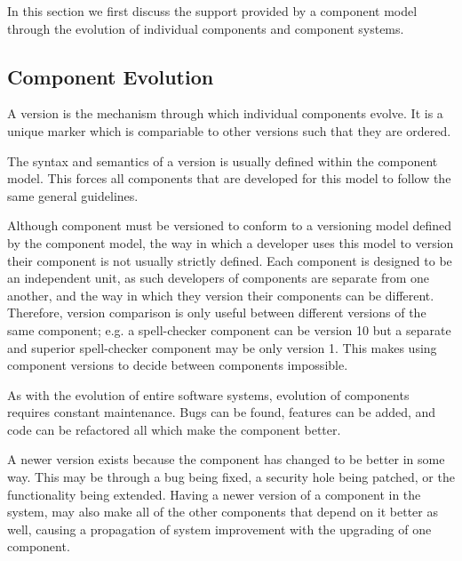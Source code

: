 
{}In this section we first discuss the support provided by a component model through the evolution of individual components and component systems.

\subsection{Component Evolution}

A version is the mechanism through which individual components evolve.
It is a unique marker which is compariable to other versions such that they are ordered.

The syntax and semantics of a version is usually defined within the component model.
This forces all components that are developed for this model to follow the same general guidelines.

Although component must be versioned to conform to a versioning model defined by the component model, 
the way in which a developer uses this model to version their component is not usually strictly defined.
Each component is designed to be an independent unit, as such developers of components are separate from one another,
and the way in which they version their components can be different.
Therefore, version comparison is only useful between different versions of the same component;
e.g. a spell-checker component can be version 10 but a separate and superior spell-checker component may be only version 1.
This makes using component versions to decide between components impossible.

As with the evolution of entire software systems, evolution of components requires constant maintenance.
Bugs can be found, features can be added, and code can be refactored all which make the component better.

A newer version exists because the component has changed to be better in some way.
This may be through a bug being fixed, a security hole being patched, or the functionality being extended.
Having a newer version of a component in the system, may also make all of the other components that depend on it better as well,
causing a propagation of system improvement with the upgrading of one component.

